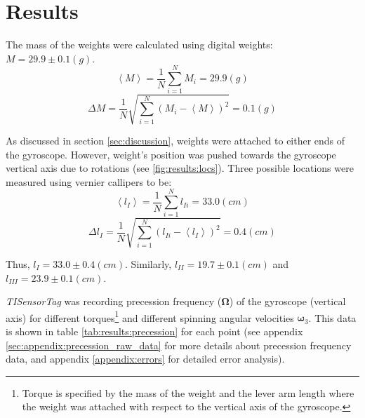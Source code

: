 \section{Results} \label{sec:results}

The mass of the weights were calculated using digital weights: $M = 29.9 \pm 0.1 (g)$.
\begin{equation*}
  \left\langle M \right\rangle = \frac{1}{N}\sum\limits_{i=1}^{N}M_{i} = 29.9 (g)
\end{equation*}
\begin{equation*}
  \Delta M = \frac{1}{N}\sqrt{\sum\limits_{i=1}^{N}(M_{i} - \left\langle M \right\rangle)^{2}} = 0.1 (g)
\end{equation*}

As discussed in section \ref{sec:discussion}, weights were attached to either ends of the gyroscope. However, weight's position was pushed towards the gyroscope vertical axis due to rotations (see \ref{fig:results:locs}). Three possible locations were measured using vernier callipers to be:
\begin{equation*}
  \left\langle l_{I} \right\rangle = \frac{1}{N}\sum\limits_{i=1}^{N}l_{Ii} = 33.0 (cm)
\end{equation*}
\begin{equation*}
  \Delta l_{I} = \frac{1}{N}\sqrt{\sum\limits_{i=1}^{N}(l_{Ii} - \left\langle l_{I} \right\rangle)^{2}} = 0.4 (cm)
\end{equation*}

Thus, $l_{I} = 33.0 \pm 0.4 (cm)$. Similarly, $l_{II} = 19.7 \pm 0.1 (cm)$ and $l_{III} = 23.9 \pm 0.1 (cm)$.

\emph{TISensorTag} was recording precession frequency ($\boldsymbol\Omega$) of the gyroscope (vertical axis) for different torques\footnote{Torque is specified by the mass of the weight and the lever arm length where the weight was attached with respect to the vertical axis of the gyroscope.} and different spinning angular velocities $\boldsymbol\omega_{3}$. This data is shown in table \ref{tab:results:precession} for each point (see appendix \ref{sec:appendix:precession_raw_data} for more details about precession frequency data, and appendix \ref{appendix:errors} for detailed error analysis).

